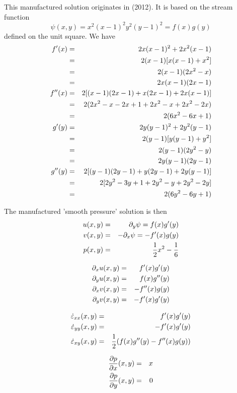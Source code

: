 This manufactured solution originates in \textcite{bocg12} (2012).
It is based on the stream function 
\[
\psi (x,y)=x^2(x-1)^2y^2(y-1)^2 =f(x)g(y)
\]
defined on the unit square. We have 
\begin{eqnarray}
f'(x)
&=&2x(x-1)^2+2x^2(x-1) \nonumber\\
&=&2(x-1)[x(x-1)+x^2]  \nonumber\\
&=&2(x-1)(2x^2 -x)  \nonumber\\
&=&2x(x-1)(2x -1)  \nonumber\\
f''(x)
&=& 2 [ (x-1)(2x -1) + x(2x-1)+2x(x-1)] \nonumber\\
&=& 2 (2x^2 -x-2x+1 + 2x^2-x+2x^2-2x) \nonumber\\
&=& 2 (6x^2 -6x +1) \nonumber\\
g'(y)
&=& 2y (y-1)^2 + 2y^2(y-1)  \nonumber\\
&=& 2(y-1)[y(y-1)+y^2] \nonumber\\
&=& 2(y-1)(2y^2-y) \nonumber\\
&=& 2y(y-1)(2y-1) \nonumber\\
g''(y) 
&=& 2[ (y-1)(2y-1) +y(2y-1)+2y(y-1) ] \nonumber\\
&=& 2[ 2y^2 - 3y +1 +2y^2-y +2y^2-2y] \nonumber\\
&=& 2(6y^2 -6y+1)
\end{eqnarray}

The manufactured 'smooth pressure' solution is then
\begin{eqnarray}
u(x,y) &=& \partial_y \psi = f(x)g'(y) \nonumber\\
v(x,y) &=& -\partial_x \psi = -f'(x)g(y) \nonumber\\
p(x,y) &=& \frac12 x^2 -\frac16 \nonumber
\end{eqnarray}

\begin{eqnarray}
\partial_x u (x,y)&=& f'(x)g'(y)\nonumber\\
\partial_y u (x,y)&=& f(x)g''(y)\nonumber\\
\partial_x v (x,y)&=& -f''(x)g(y)\nonumber\\
\partial_y v (x,y)&=& -f'(x)g'(y)\nonumber
\end{eqnarray}

\begin{eqnarray}
\dot\varepsilon_{xx}(x,y) &=& f'(x)g'(y) \nonumber\\
\dot\varepsilon_{yy}(x,y) &=&  -f'(x)g'(y) \nonumber\\
\dot\varepsilon_{xy}(x,y) &=& \frac12(f(x)g''(y)-f''(x)g(y)) \nonumber
\end{eqnarray}

\begin{eqnarray}
\frac{\partial p}{\partial x} (x,y)&=& x\nonumber\\
\frac{\partial p}{\partial y} (x,y)&=& 0\nonumber
\end{eqnarray}

